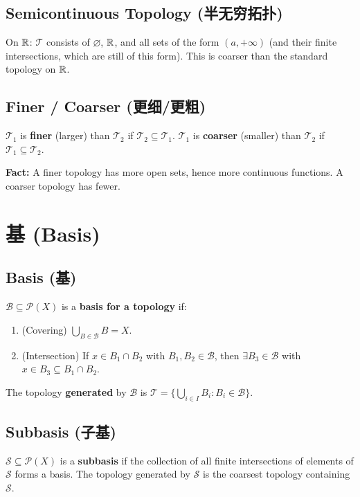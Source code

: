 \documentclass{article}
\begin{document}
\subsection{Semicontinuous Topology (半无穷拓扑)}\label{def:semicontinuous}
On $\mathbb{R}$: $\mathcal{T}$ consists of $\varnothing$, $\mathbb{R}$, and all sets
of the form $(a, +\infty)$ (and their finite intersections, which are
still of this form).
This is coarser than the standard topology on $\mathbb{R}$.

\subsection{Finer / Coarser (更细/更粗)}\label{def:finer-coarser}
$\mathcal{T}_1$ is \textbf{finer} (larger) than $\mathcal{T}_2$ if
$\mathcal{T}_2 \subseteq \mathcal{T}_1$.
$\mathcal{T}_1$ is \textbf{coarser} (smaller) than $\mathcal{T}_2$ if
$\mathcal{T}_1 \subseteq \mathcal{T}_2$.

\textbf{Fact:} A finer topology has more open sets, hence more
continuous functions. A coarser topology has fewer.

\section{基 (Basis)}

\subsection{Basis (基)}\label{def:basis}
\begin{definition}
  $\mathcal{B} \subseteq \mathcal{P}(X)$ is a \textbf{basis for a topology} if:
  \begin{enumerate}
    \item (Covering) $\bigcup_{B \in \mathcal{B}} B = X$.
    \item (Intersection) If $x \in B_1 \cap B_2$ with $B_1, B_2 \in
      \mathcal{B}$, then $\exists B_3 \in \mathcal{B}$ with $x \in
      B_3 \subseteq B_1 \cap B_2$.
  \end{enumerate}
\end{definition}
The topology \textbf{generated} by $\mathcal{B}$ is $\mathcal{T} =
\{\bigcup_{i \in I} B_i : B_i \in \mathcal{B}\}$.

\subsection{Subbasis (子基)}\label{def:subbasis}
$\mathcal{S} \subseteq \mathcal{P}(X)$ is a \textbf{subbasis} if the
collection of all finite intersections of elements of $\mathcal{S}$
forms a basis.
The topology generated by $\mathcal{S}$ is the coarsest topology
containing $\mathcal{S}$.
\end{document}
